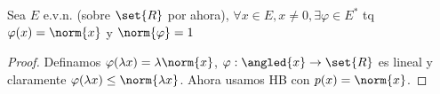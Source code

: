 \documentclass{notetaking}
\begin{document}
\begin{cor}
    Sea \(E\) e.v.n. (sobre \(\set{R}\) por ahora), \(\forall x\in E, x\neq0,\exists \varphi\in E^*\) tq \(\varphi(x)=\norm{x}\) y \(\norm{\varphi}=1\)
\end{cor}
\begin{proof}
    Definamos \(\varphi(\lambda x)=\lambda\norm{x}\), \(\varphi:\angled{x}\rightarrow\set{R}\) es lineal y claramente \(\varphi(\lambda x)\leq\norm{\lambda x}\). Ahora usamos HB con \(p(x)=\norm{x}\).
\end{proof}
\end{document}
